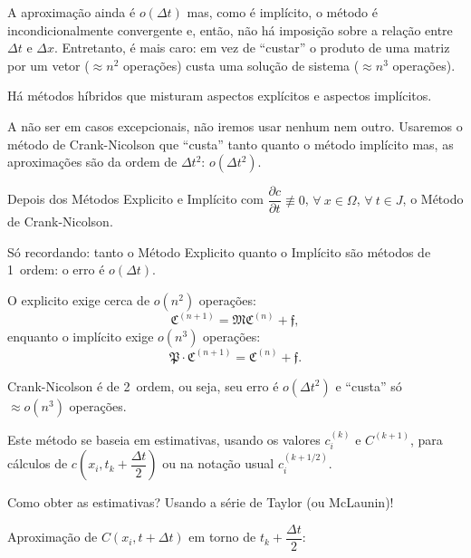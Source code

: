 \begin{enumerate}
\begin{remark}
A aproximação ainda é $o\left(\Delta t\right)$ mas, como é implícito, o método é incondicionalmente convergente e, então, não há imposição sobre a relação entre $\Delta t$ e $\Delta x$. Entretanto, é mais caro: em vez de ``custar'' o produto de uma matriz por um vetor ($\approx n^{2}$ operações) custa uma solução de sistema ($\approx n^{3}$ operações).
\end{remark}


Há métodos híbridos que misturam aspectos explícitos e aspectos implícitos. 

A não ser em casos excepcionais, não iremos usar nenhum nem outro. Usaremos o método de Crank-Nicolson que ``custa'' tanto quanto o método implícito mas, as aproximações são da ordem de $\Delta t^{2}$: $o\left(\Delta t^{2}\right)$.
\end{enumerate}






Depois dos Métodos Explicito e Implícito com $\dfrac{\partial c}{\partial t} \not\equiv 0$, $\forall\ x \in \Omega$, $\forall\ t \in J$, o Método de Crank-Nicolson.

Só recordando: tanto o Método Explicito quanto o Implícito são métodos de 1\textordfeminine\ ordem: o erro é $o(\Delta t)$.

O explicito exige cerca de $o(n^{2})$ operações:
\begin{equation}
\mathfrak{C}^{(n+1)} = \mathfrak{M} \mathfrak{C}^{(n)} + \mathfrak{f},
\end{equation}
enquanto o implícito exige $o(n^{3})$ operações:
\begin{equation}
\mathfrak{P} \cdot \mathfrak{C}^{(n+1)} = \mathfrak{C}^{(n)} + \mathfrak{f}.
\end{equation}

Crank-Nicolson é de 2\textordfeminine\ ordem, ou seja, seu erro é $o(\Delta t^2)$ e ``custa'' só $\approx o(n^3)$ operações.

Este método se baseia em estimativas, usando os valores $c_i^{(k)}$ e $C^{(k+1)}$, para cálculos de $c\left(x_i, t_k + \dfrac{\Delta t}{2}\right)$ ou na notação usual $c_i^{(k+ 1/2)}$.

Como obter as estimativas? Usando a série de Taylor (ou McLaunin)!

Aproximação de $C(x_i, t + \Delta t)$ em torno de $t_k + \dfrac{\Delta t}{2}$:

